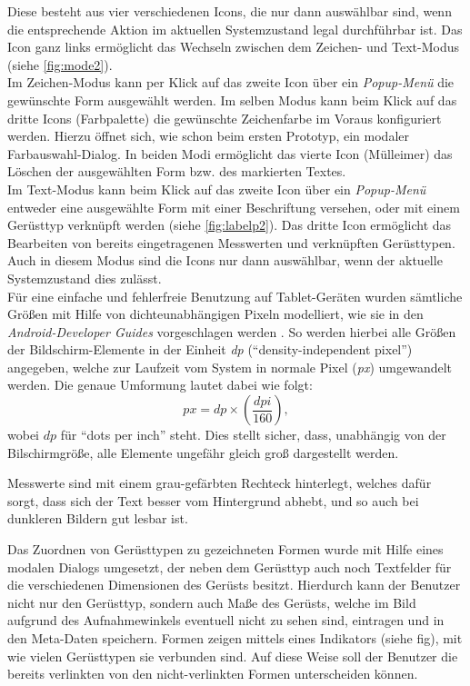 \noindent
Diese besteht aus vier verschiedenen Icons, die nur dann auswählbar sind, wenn die entsprechende Aktion im aktuellen Systemzustand legal durchführbar ist.
Das Icon ganz links ermöglicht das Wechseln zwischen dem Zeichen- und Text-Modus (siehe \autoref{fig:mode2}). \\

Im Zeichen-Modus kann per Klick auf das zweite Icon über ein \emph{Popup-Menü} die gewünschte Form ausgewählt werden. 
Im selben Modus kann beim Klick auf das dritte Icons (Farbpalette) die gewünschte Zeichenfarbe im Voraus konfiguriert werden. Hierzu öffnet sich, wie schon beim ersten Prototyp, ein modaler Farbauswahl-Dialog.
In beiden Modi ermöglicht das vierte Icon (Mülleimer) das Löschen der ausgewählten Form bzw. des markierten Textes. \\

Im Text-Modus kann beim Klick auf das zweite Icon über ein \emph{Popup-Menü} entweder eine ausgewählte Form mit einer Beschriftung versehen, oder mit einem Gerüsttyp verknüpft werden (siehe \autoref{fig:labelp2}).
Das dritte Icon ermöglicht das Bearbeiten von bereits eingetragenen Messwerten und verknüpften Gerüsttypen.
Auch in diesem Modus sind die Icons nur dann auswählbar, wenn der aktuelle Systemzustand dies zulässt. \\

Für eine einfache und fehlerfreie Benutzung auf Tablet-Geräten wurden sämtliche Größen mit Hilfe von dichteunabhängigen Pixeln modelliert, wie sie in den \emph{Android-Developer Guides} vorgeschlagen werden \citep{DP18}.
So werden hierbei alle Größen der Bildschirm-Elemente in der Einheit \emph{dp} (``density-independent pixel'') angegeben, welche zur Laufzeit vom System in normale Pixel (\emph{px}) umgewandelt werden.
Die genaue Umformung lautet dabei wie folgt:
\[
  px =  dp \times (\frac{dpi}{160}),
\]
wobei $dp$ für ``dots per inch'' steht.
Dies stellt sicher, dass, unabhängig von der Bilschirmgröße, alle Elemente ungefähr gleich groß dargestellt werden. \\

Messwerte sind mit einem grau-gefärbten Rechteck hinterlegt, welches dafür sorgt, dass sich der Text besser vom Hintergrund abhebt, und so auch bei dunkleren Bildern gut lesbar ist.

Das Zuordnen von Gerüsttypen zu gezeichneten Formen wurde mit Hilfe eines modalen Dialogs umgesetzt, der neben dem Gerüsttyp auch noch Textfelder für die verschiedenen Dimensionen des Gerüsts besitzt.
Hierdurch kann der Benutzer nicht nur den Gerüsttyp, sondern auch Maße des Gerüsts, welche im Bild aufgrund des Aufnahmewinkels eventuell nicht zu sehen sind, eintragen und in den Meta-Daten speichern.
Formen zeigen mittels eines Indikators (siehe fig), mit wie vielen Gerüsttypen sie verbunden sind.
Auf diese Weise soll der Benutzer die bereits verlinkten von den nicht-verlinkten Formen unterscheiden können. \\

